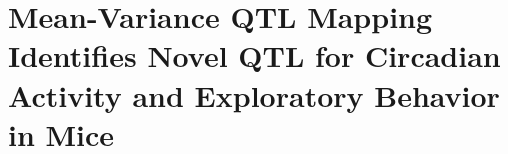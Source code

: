 \chapter{Mean-Variance QTL Mapping Identifies Novel QTL for Circadian Activity and Exploratory Behavior in Mice}
\label{chap:mvqtl_reanalyses}

\lipsum